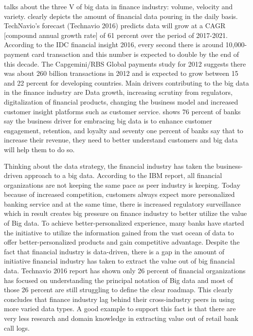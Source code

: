 \indent

\cite{Ref2}  talks about the three V of big data in finance industry: volume, velocity and variety. 
\cite{Ref3} clearly depicts the amount of financial data pouring in the daily basis. 
TechNavio’s forecast (Technavio 2016) predicts data will grow at a CAGR [compound annual growth rate] of 61 percent over the period of 2017-2021.
 According to the IDC financial insight 2016, every second there is around 10,000-payment card transaction and this number is expected to double by the end
 of this decade. The Capgemini/RBS Global payments study for 2012 suggests there was about 260 billion transactions in 2012 and is expected to grow between 15
 and 22 percent for developing countries. Main drivers contributing to the big data in the finance industry are Data growth, increasing scrutiny from regulators,
 digitalization of financial products, changing the business model and increased customer insight platforms such as customer service. 
 \cite{Ref2} shows 76 percent of banks say the business driver for embracing big data is to enhance customer engagement, retention, and loyalty and seventy one percent
 of banks say that to increase their revenue, they need to better understand customers and big data will help them to do so. 

\indent

Thinking about the data strategy, the financial industry has taken the business-driven approach to a big data. According to the IBM report, all financial 
organizations are not keeping the same pace as peer industry is keeping. Today because of increased competition, customers always expect more personalized 
banking service and at the same time, there is increased regulatory surveillance which in result creates big pressure on finance industry to better utilize
 the value of Big data. To achieve better-personalized experience, many banks have started the initiative to utilize the information gained from the vast
 ocean of data to offer better-personalized products and gain competitive advantage.  Despite the fact that financial industry is data-driven,
 there is a gap in the amount of initiative financial industry has taken to extract the value out of big financial data.
 Technavio 2016 report has shown only 26 percent of financial organizations has focused on understanding the principal notation of Big data and most 
 of those 26 percent are still struggling to define the clear roadmap. This clearly concludes that finance industry lag behind their cross-industry peers 
 in using more varied data types. A good example to support this fact is that there are very less research and domain knowledge in extracting value out of 
 retail bank call logs.  

